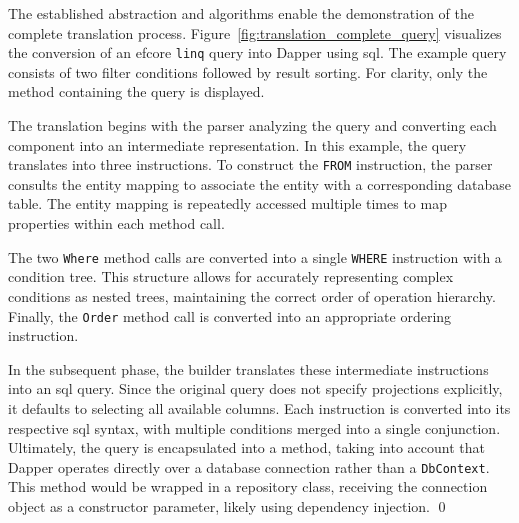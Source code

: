 \FloatBarrier
\begin{example}
\small

The established abstraction and algorithms enable the demonstration of the complete translation process. Figure~\ref{fig:translation_complete_query} visualizes the conversion of an \acrshort{efcore} \texttt{linq} query into Dapper using \acrshort{sql}. The example query consists of two filter conditions followed by result sorting. For clarity, only the method containing the query is displayed. 

The translation begins with the parser analyzing the query and converting each component into an intermediate representation. In this example, the query translates into three instructions. To construct the \texttt{FROM} instruction, the parser consults the entity mapping to associate the entity with a corresponding database table. The entity mapping is repeatedly accessed multiple times to map  properties within each method call.

The two \texttt{Where} method calls are converted into a single \texttt{WHERE} instruction with a condition tree. This structure allows for accurately representing complex conditions as nested trees, maintaining the correct order of operation hierarchy. Finally, the \texttt{Order} method call is converted into an appropriate ordering instruction.

In the subsequent phase, the builder translates these intermediate instructions into an \acrshort{sql} query. Since the original query does not specify projections explicitly, it defaults to selecting all available columns. Each instruction is converted into its respective \acrshort{sql} syntax, with multiple conditions merged into a single conjunction. Ultimately, the query is encapsulated into a method, taking into account that Dapper operates directly over a database connection rather than a \texttt{DbContext}. This method would be wrapped in a repository class, receiving the connection object as a constructor parameter, likely using dependency injection. 
\qed
\end{example}

